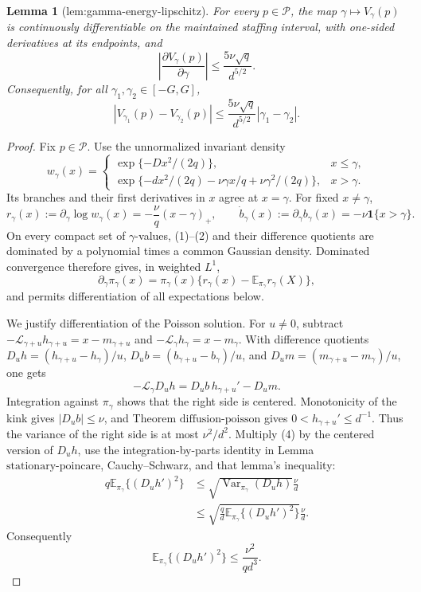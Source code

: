 \documentclass{article}
\newtheorem{lemma}{Lemma}
\begin{document}
\begin{lemma}[lem:gamma-energy-lipschitz]\label{lem:gamma-energy-lipschitz}
For every \(p\in\mathcal P\), the map \(\gamma\mapsto V_\gamma(p)\) is continuously differentiable on the maintained staffing interval, with one-sided derivatives at its endpoints, and
\[
 \left|\frac{\partial V_\gamma(p)}{\partial\gamma}\right|
 \leq \frac{5\nu\sqrt q}{d^{5/2}}.
\]
Consequently, for all \(\gamma_1,\gamma_2\in[-G,G]\),
\[
 |V_{\gamma_1}(p)-V_{\gamma_2}(p)|
 \leq \frac{5\nu\sqrt q}{d^{5/2}}|\gamma_1-\gamma_2|.
\]
\end{lemma}
\begin{proof}
Fix \(p\in\mathcal P\).  Use the unnormalized invariant density
\[
 w_\gamma(x)=
 \begin{cases}
 \exp\{-Dx^2/(2q)\},&x\leq\gamma,\\
 \exp\{-dx^2/(2q)-\nu\gamma x/q+\nu\gamma^2/(2q)\},&x>\gamma.
 \end{cases}                                                   \tag{1}
\]
Its branches and their first derivatives in \(x\) agree at \(x=\gamma\).  For fixed \(x\ne\gamma\),
\[
 r_\gamma(x):=\partial_\gamma\log w_\gamma(x)
 =-\frac\nu q(x-\gamma)_+,
 \qquad
 \dot b_\gamma(x):=\partial_\gamma b_\gamma(x)
 =-\nu\mathbf1\{x>\gamma\}.                                 \tag{2}
\]
On every compact set of \(\gamma\)-values, (1)--(2) and their difference quotients are dominated by a polynomial times a common Gaussian density.  Dominated convergence therefore gives, in weighted \(L^1\),
\[
 \partial_\gamma\pi_\gamma(x)
 =\pi_\gamma(x)\{r_\gamma(x)-\mathbb E_{\pi_\gamma}r_\gamma(X)\}, \tag{3}
\]
and permits differentiation of all expectations below.

We justify differentiation of the Poisson solution.  For \(u\ne0\), subtract
\(-\mathcal L_{\gamma+u}h_{\gamma+u}=x-m_{\gamma+u}\) and
\(-\mathcal L_\gamma h_\gamma=x-m_\gamma\).  With difference quotients \(D_uh=(h_{\gamma+u}-h_\gamma)/u\), \(D_ub=(b_{\gamma+u}-b_\gamma)/u\), and \(D_um=(m_{\gamma+u}-m_\gamma)/u\), one gets
\[
 -\mathcal L_\gamma D_uh=D_ub\,h_{\gamma+u}'-D_um.           \tag{4}
\]
Integration against \(\pi_\gamma\) shows that the right side is centered.  Monotonicity of the kink gives \(|D_ub|\leq\nu\), and Theorem \(\mathrm{diffusion\mbox{-}poisson}\) gives \(0<h_{\gamma+u}'\leq d^{-1}\).  Thus the variance of the right side is at most \(\nu^2/d^2\).  Multiply (4) by the centered version of \(D_uh\), use the integration-by-parts identity in Lemma \(\mathrm{stationary\mbox{-}poincare}\), Cauchy--Schwarz, and that lemma's inequality:
\[
 \begin{split}
 q\mathbb E_{\pi_\gamma}\{(D_uh')^2\}
 &\leq\sqrt{\operatorname{Var}_{\pi_\gamma}(D_uh)}\frac\nu d\\
 &\leq\sqrt{\frac qd\mathbb E_{\pi_\gamma}\{(D_uh')^2\}}\frac\nu d.
                                                                    \tag{5}
 \end{split}
\]
Consequently
\[
 \mathbb E_{\pi_\gamma}\{(D_uh')^2\}
 \leq\frac{\nu^2}{qd^3}.                                     \tag{6}
\]


\end{proof}
\end{document}
